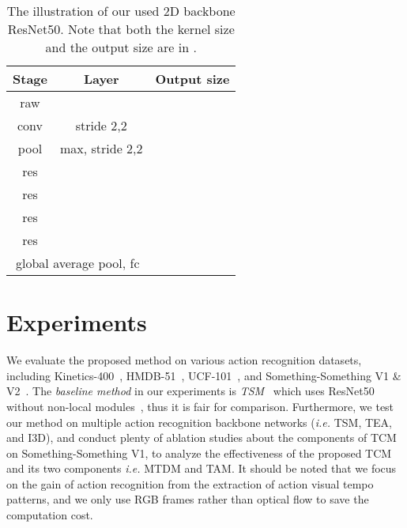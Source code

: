 \documentclass[journal]{IEEEtran}
\begin{document}
\begin{table}[!ht]
\centering
\caption{The illustration of our used 2D backbone ResNet50. Note that both the kernel size and the output size are in .}
\label{tab:backbone-r50}
\begin{tabular}{c|c|c}
\hline
Stage & Layer & Output size \\ \hline
raw &  &  \\ \hline
conv &  stride 2,2 &  \\ \hline
pool &  max, stride 2,2 &  \\ \hline
res & {} &  \\ \hline
res & {} &  \\ \hline
res & {} &  \\ \hline
res & {} &  \\ \hline
\multicolumn{2}{c|}{ global average pool, fc } &   \\ \hline
\end{tabular}
\end{table}


\section{Experiments}
We evaluate the proposed method on various action recognition datasets, including Kinetics-400~\cite{kay2017kinetics}, HMDB-51~\cite{Kuehne11}, UCF-101~\cite{soomro2012ucf101}, and Something-Something V1 \& V2~\cite{goyal2017something}. The \textit{baseline method} in our experiments is \textit{TSM}~\cite{lin2019tsm} which uses ResNet50~\cite{he2016deep} without non-local modules~\cite{NonLocal2018}, thus it is fair for comparison. Furthermore, we test our method on multiple action recognition backbone networks (\textit{i.e.} TSM, TEA, and I3D), and conduct plenty of ablation studies about the components of TCM on Something-Something V1, to analyze the effectiveness of the proposed TCM and its two components \textit{i.e.} MTDM and TAM. It should be noted that we focus on the gain of action recognition from the extraction of action visual tempo patterns, and we only use RGB frames rather than optical flow to save the computation cost.
\end{document}

